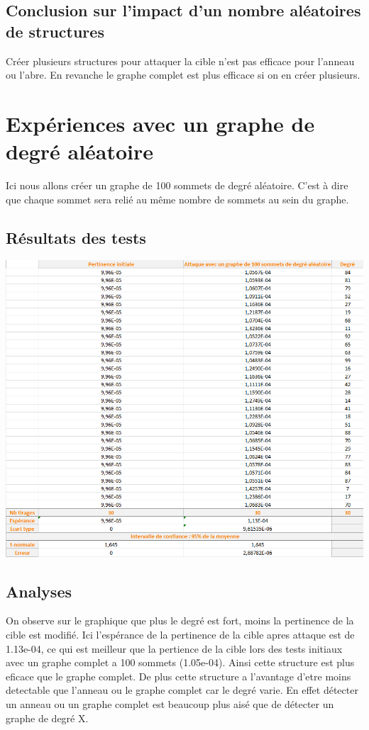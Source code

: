 \documentclass[a4paper,11pt]{article}
\begin{document}
	\subsection{Conclusion sur l'impact d'un nombre aléatoires de structures}
		Créer plusieurs structures pour attaquer la cible n'est pas efficace pour l'anneau ou l'abre. En revanche le graphe complet est plus efficace si on en créer plusieurs. 

\section{Expériences avec un graphe de degré aléatoire}
	Ici nous allons créer un graphe de 100 sommets de degré aléatoire. C'est à dire que chaque sommet sera relié au même nombre de sommets au sein du graphe.

	\subsection{Résultats des tests}
		\includegraphics[scale = 0.5]{Captures/ranking4.PNG}\\
		
	
	\subsection{Analyses}
		On observe sur le graphique que plus le degré est fort, moins la pertinence de la cible est modifié. Ici l'espérance de la pertinence de la cible apres attaque est de 1.13e-04, ce qui est 
		meilleur que la pertience de la cible lors des tests initiaux avec un graphe complet a 100 sommets (1.05e-04). Ainsi cette structure est plus eficace que le graphe complet.
		De plus cette structure a l'avantage d'etre moins detectable que l'anneau ou le graphe complet car le degré varie. En effet détecter un anneau ou un graphe complet est beaucoup plus aisé 
		que de détecter un graphe de degré X.
	
\end{document}
